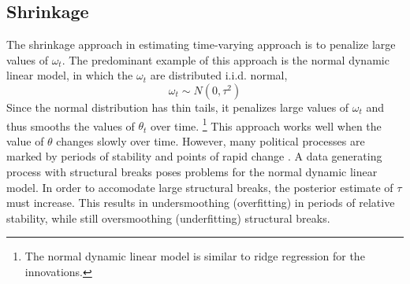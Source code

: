 \documentclass{article}
\begin{document}
\subsection{Shrinkage}
\label{sec:shrinkage}

The shrinkage approach in estimating time-varying approach is to penalize large values of $\omega_{t}$. 
The predominant example of this approach is the normal dynamic linear model, in which the $\omega_{t}$ are distributed i.i.d. normal,
\begin{equation}
  \label{eq:4}
  \omega_{t} \sim N(0, \tau^{2})
\end{equation}
Since the normal distribution has thin tails, it penalizes large values of $\omega_{t}$ and thus smooths the values of $\theta_{t}$ over time.
\footnote{The normal dynamic linear model is similar to ridge regression for the innovations.}
This approach works well when the value of $\theta$ changes slowly over time.
However, many political processes are marked by periods of stability and points of rapid change \parencite{RatkovicEng2010}.
A data generating process with structural breaks poses problems for the normal dynamic linear model.
In order to accomodate large structural breaks, the posterior estimate of $\tau$ must increase. 
This results in undersmoothing (overfitting) in periods of relative stability, while still oversmoothing (underfitting) structural breaks.
\end{document}
